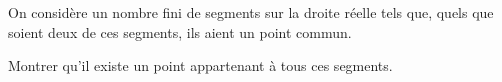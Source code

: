 On considère un nombre fini de segments sur la droite réelle tels que, quels que soient deux de ces segments, ils aient un point commun.

Montrer qu’il existe un point appartenant à tous ces segments.